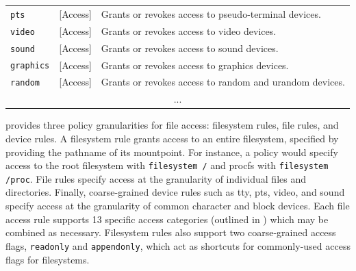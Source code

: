 {\begin{longtable}[c]{llp{25em}}
  \texttt{pts}        & [Access]            &
    Grants or revokes access to pseudo-terminal devices. \\
  \texttt{video}      & [Access]            &
    Grants or revokes access to video devices. \\
  \texttt{sound}      & [Access]            &
    Grants or revokes access to sound devices. \\
  \texttt{graphics}   & [Access]            &
    Grants or revokes access to graphics devices. \\
  \texttt{random}   & [Access]            &
    Grants or revokes access to random and urandom devices. \\
  \multicolumn{3}{c}{...} \\
  \bottomrule
\end{longtable}
}

\bpfcontain{} provides three policy granularities for file access: filesystem rules, file rules, and device rules. A filesystem rule grants access to an entire filesystem, specified by providing the pathname of its mountpoint. For instance, a policy would specify access to the root filesystem with \texttt{filesystem /} and procfs with \texttt{filesystem /proc}. File rules specify access at the granularity of individual files and directories. Finally, coarse-grained device rules such as tty, pts, video, and sound specify access at the granularity of common character and block devices. Each file access rule supports 13 specific access categories (outlined in ) which may be combined as necessary. Filesystem rules also support two coarse-grained access flags, \texttt{readonly} and \texttt{appendonly}, which act as shortcuts for commonly-used access flags for filesystems.


